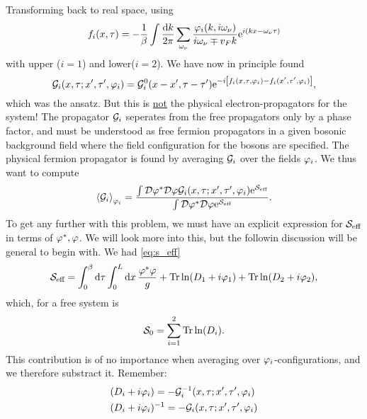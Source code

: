 Transforming back to real space, using
\begin{equation}
\label{eq:fourier_transformed_field_2}
f_i(x,\tau) = -\frac{1}{\beta}\int\frac{\dd k}{2\pi}\sum_{\omega_\nu}\frac{\varphi_i(k,i\omega_\nu)}{i\omega_\nu \mp v_Fk}\mathrm{e}^{i(kx-\omega_\nu\tau)}
\end{equation}
with upper ($i=1$) and lower($i=2$). We have now in principle found
\begin{equation}
	\mathcal{G}_i(x,\tau;x',\tau',\varphi_i) = \mathcal{G}_i^0(x-x',\tau-\tau')\mathrm{e}^{-i\left[f_i(x,\tau,\varphi_i)-f_i(x',\tau',\varphi_i)\right]},
\end{equation}
which was the ansatz. But this is \underline{not} the physical electron-propagators for the system! 
The propagator \(\mathcal{G}_i\) seperates from the free propagators only by a phase factor, and must be understood as free fermion propagators in a given bosonic background field where the field configuration for the bosons are specified.
The physical fermion propagator is found by averaging $\mathcal{G}_i$ over the fields $\varphi_i$. 
We thus want to compute
\begin{equation}
\label{eq:averaged_greens}
\ev{\gre_i}_{\p_i} = \frac{\int\D\p^*\D\p\gre_i(x, \tau;x', \tau', \p_i)\e^{\Sa_{\text{eff}}}}{\int\D\p^*\D\p\e^{\Sa_{\text{eff}}}}.
\end{equation}
To get any further with this problem, we must have an explicit expression for $\mathcal{S}_{\text{eff}}$ in terms of $\varphi^*,\varphi$. We will look more into this, but the followin discussion will be general to begin with. We had \cref{eq:s_eff}
\begin{equation*}
\mathcal{S}_{\text{eff}} = \int_{0}^{\beta}\dd\tau\int_{0}^{L}\dd{x}\frac{\varphi^*\varphi}{g} + \Tr\ln(D_1+i\varphi_1) + \Tr\ln(D_2 +i\varphi_2),
\end{equation*}
which, for a free system is
\begin{equation}
\mathcal{S}_0 =\sum_{i=1}^2\Tr\ln(D_i).
\end{equation}
This contribution is of no importance when averaging over $\varphi_i$-configurations, and we therefore substract it.
Remember:
\begin{align*}
	(D_i + i\varphi_i) &= -\mathcal{G}_i^{-1}(x,\tau;x',\tau',\varphi_i) \\
	(D_i + i\varphi_i)&^{-1} = -\mathcal{G}_i(x,\tau;x',\tau',\varphi_i)
\end{align*}

